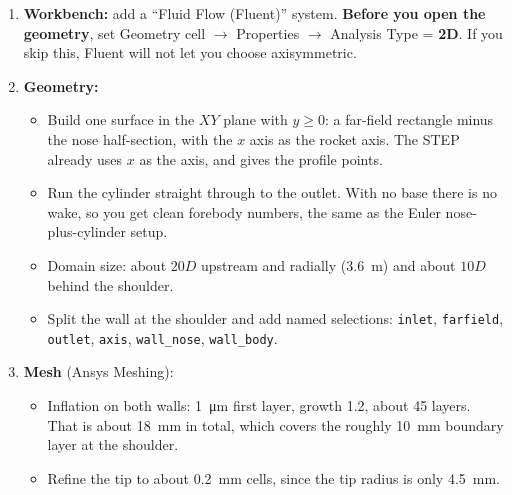 \documentclass[11pt]{article}
\newcommand{\file}[1]{\path{#1}}
\begin{document}
\begin{enumerate}
\item \textbf{Workbench:} add a ``Fluid Flow (Fluent)'' system. \textbf{Before you open the geometry},
set Geometry cell $\rightarrow$ Properties $\rightarrow$ Analysis Type = \textbf{2D}. If you skip this,
Fluent will not let you choose axisymmetric.

\item \textbf{Geometry:}
\begin{itemize}
\item Build one surface in the $XY$ plane with $y \geq 0$: a far-field rectangle minus the nose
half-section, with the $x$ axis as the rocket axis. The STEP already uses $x$ as the axis, and
\file{nose_profile_final.csv} gives the profile points.
\item Run the cylinder straight through to the outlet. With no base there is no wake, so you get
clean forebody numbers, the same as the Euler nose-plus-cylinder setup.
\item Domain size: about $20D$ upstream and radially (\SI{3.6}{m}) and about $10D$ behind the shoulder.
\item Split the wall at the shoulder and add named selections: \texttt{inlet}, \texttt{farfield},
\texttt{outlet}, \texttt{axis}, \texttt{wall\_nose}, \texttt{wall\_body}.
\end{itemize}

\item \textbf{Mesh} (Ansys Meshing):
\begin{itemize}
\item Inflation on both walls: \SI{1}{\micro m} first layer, growth 1.2, about 45 layers. That is
about \SI{18}{mm} in total, which covers the roughly \SI{10}{mm} boundary layer at the shoulder.
\item Refine the tip to about \SI{0.2}{mm} cells, since the tip radius is only \SI{4.5}{mm}.
\end{itemize}


\end{enumerate}
\end{document}
